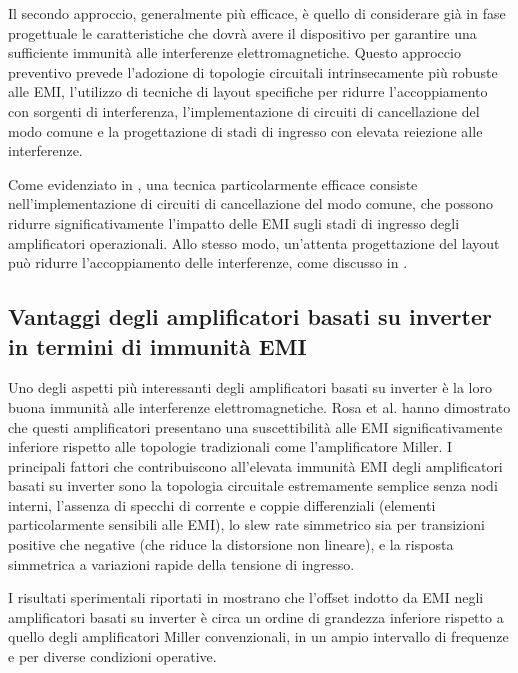 Il secondo approccio, generalmente più efficace, è quello di considerare già in fase progettuale le caratteristiche che dovrà avere il dispositivo per garantire una sufficiente immunità alle interferenze elettromagnetiche. Questo approccio preventivo prevede l'adozione di topologie circuitali intrinsecamente più robuste alle EMI, l'utilizzo di tecniche di layout specifiche per ridurre l'accoppiamento con sorgenti di interferenza, l'implementazione di circuiti di cancellazione del modo comune e la progettazione di stadi di ingresso con elevata reiezione alle interferenze.

Come evidenziato in \cite{An_EMI-Resistant_Common-Mode_Cancelation_Differential_Input_Stage_in_UMC_180_nm_CMOS}, una tecnica particolarmente efficace consiste nell'implementazione di circuiti di cancellazione del modo comune, che possono ridurre significativamente l'impatto delle EMI sugli stadi di ingresso degli amplificatori operazionali. Allo stesso modo, un'attenta progettazione del layout può ridurre l'accoppiamento delle interferenze, come discusso in \cite{finalprint}.

\subsection{Vantaggi degli amplificatori basati su inverter in termini di immunità EMI}

Uno degli aspetti più interessanti degli amplificatori basati su inverter è la loro buona immunità alle interferenze elettromagnetiche. Rosa et al. \cite{EMI_Immunity_of_the_Nauta_Inverter-Based_Amplifier} hanno dimostrato che questi amplificatori presentano una suscettibilità alle EMI significativamente inferiore rispetto alle topologie tradizionali come l'amplificatore Miller. I principali fattori che contribuiscono all'elevata immunità EMI degli amplificatori basati su inverter sono la topologia circuitale estremamente semplice senza nodi interni, l'assenza di specchi di corrente e coppie differenziali (elementi particolarmente sensibili alle EMI), lo slew rate simmetrico sia per transizioni positive che negative (che riduce la distorsione non lineare), e la risposta simmetrica a variazioni rapide della tensione di ingresso.

I risultati sperimentali riportati in \cite{EMI_Immunity_of_the_Nauta_Inverter-Based_Amplifier} mostrano che l'offset indotto da EMI negli amplificatori basati su inverter è circa un ordine di grandezza inferiore rispetto a quello degli amplificatori Miller convenzionali, in un ampio intervallo di frequenze e per diverse condizioni operative.

